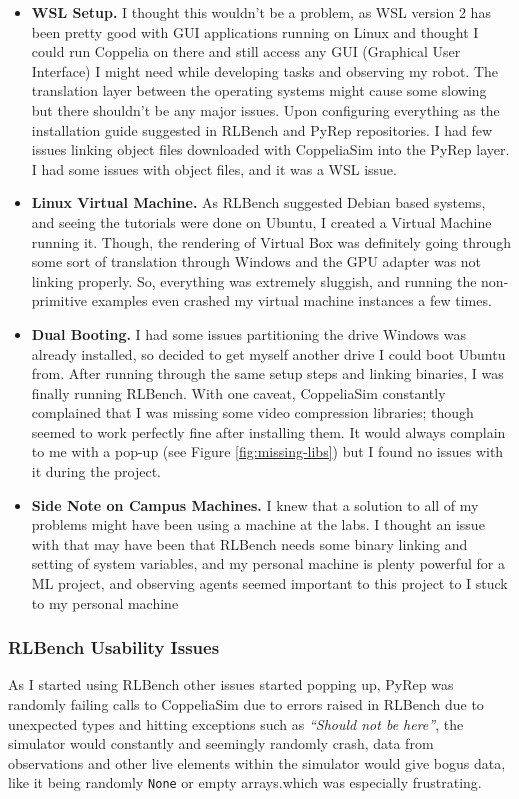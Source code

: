 \begin{itemize}
  \item\textbf{WSL Setup.}
  I thought this wouldn't be a problem, as WSL version 2 has been pretty good with GUI applications running on Linux and thought I could run Coppelia on there and still access any GUI (Graphical User Interface) I might need while developing tasks and observing my robot. The translation layer between the operating systems might cause some slowing but there shouldn't be any major issues. Upon configuring everything as the installation guide suggested in RLBench and PyRep repositories. I had few issues linking object files downloaded with CoppeliaSim into the PyRep layer. I had some issues with object files, and it was a WSL issue.

  \item\textbf{Linux Virtual Machine.}
  As RLBench suggested Debian based systems, and seeing the tutorials were done on Ubuntu, I created a Virtual Machine running it. Though, the rendering of Virtual Box was definitely going through some sort of translation through Windows and the GPU adapter was not linking properly. So, everything was extremely sluggish, and running the non-primitive examples even crashed my virtual machine instances a few times.

  \item\textbf{Dual Booting.}
  I had some issues partitioning the drive Windows was already installed, so decided to get myself another drive I could boot Ubuntu from. After running through the same setup steps and linking binaries, I was finally running RLBench. With one caveat, CoppeliaSim constantly complained that I was missing some video compression libraries; though seemed to work perfectly fine after installing them. It would always complain to me with a pop-up (see Figure \ref{fig:missing-libs}) but I found no issues with it during the project.

  \item\textbf{Side Note on Campus Machines.}
  I knew that a solution to all of my problems might have been using a machine at the labs. I thought an issue with that may have been that RLBench needs some binary linking and setting of system variables, and my personal machine is plenty powerful for a ML project, and observing agents seemed important to this project to I stuck to my personal machine
\end{itemize}

\subsubsection{RLBench Usability Issues}
As I started using RLBench other issues started popping up, PyRep was randomly failing calls to CoppeliaSim due to errors raised in RLBench due to unexpected types and hitting exceptions such as \emph{``Should not be here''}, the simulator would constantly and seemingly randomly crash, data from observations and other live elements within the simulator would give bogus data, like it being randomly \verb|None| or empty arrays.which was especially frustrating. 

